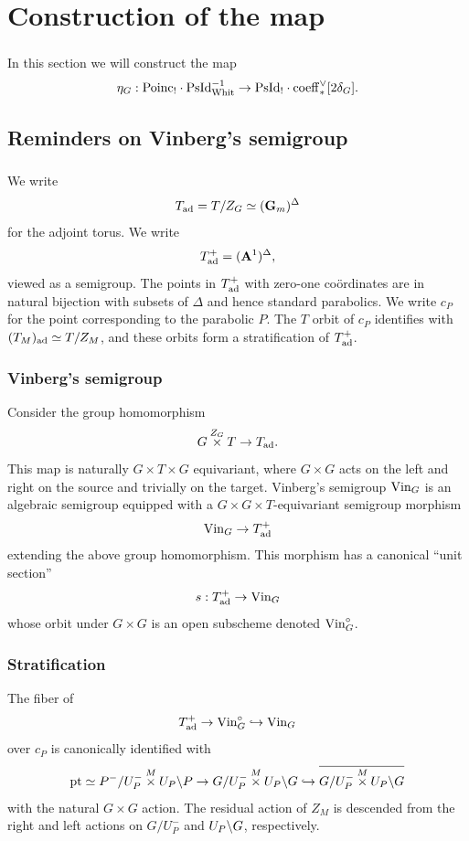 \section{Construction of the map}
\label{section:construction}

\subsubsection{} In this section we will construct the map
  \[\eta_G : \mathrm{Poinc}_! \cdot \mathrm{PsId}_{\mathrm{Whit}}^{-1} \to \mathrm{PsId}_! \cdot \mathrm{coeff}_*^\vee [2 \delta_G].\]

\subsection{Reminders on Vinberg's semigroup}

\subsubsection{} We write
    \[T_{\mathrm{ad}} = T/Z_G \simeq (\mathbf{G}_m)^\Delta\]
for the adjoint torus. We write
    \[T_{\mathrm{ad}}^+ = (\mathbf{A}^1)^\Delta,\]
viewed as a semigroup. The points in $T_{\mathrm{ad}}^+$ with zero-one co\"ordinates are in natural bijection with subsets of $\Delta$ and hence standard parabolics. We write $c_P$ for the point corresponding to the parabolic $P$. The $T$ orbit of $c_P$ identifies with $(T_M)_{\mathrm{ad}} \simeq T/Z_M$, and these orbits form a stratification of $T_{\mathrm{ad}}^+$.

\subsubsection{Vinberg's semigroup} Consider the group homomorphism
    \[G \overset{Z_G}{\times} T \to T_{\mathrm{ad}}.\]
This map is naturally $G \times T \times G$ equivariant, where $G \times G$ acts on the left and right on the source and trivially on the target. Vinberg's semigroup $\mathrm{Vin}_G$ is an algebraic semigroup equipped with a $G \times G \times T$-equivariant semigroup morphism
    \[\mathrm{Vin}_G \to T_{\mathrm{ad}}^+\]
extending the above group homomorphism. This morphism has a canonical ``unit section''
    \[s : T^+_{\mathrm{ad}} \to \mathrm{Vin}_G\]
whose orbit under $G \times G$ is an open subscheme denoted $\mathrm{Vin}_G^\circ$.

\subsubsection{Stratification} The fiber of
    \[T_{\mathrm{ad}}^+ \to \mathrm{Vin}_G^\circ \hookrightarrow \mathrm{Vin}_G\]
over $c_P$ is canonically identified with
\begin{equation}
\label{eqn:Vin_G_strata}    
    \mathrm{pt} \simeq P^-/U_P^- \overset{M}{\times} U_P \backslash P
    \to G/U_P^- \overset{M}{\times} U_P \backslash G 
    \hookrightarrow \overline{G/U_P^- \overset{M}{\times} U_P \backslash G}
\end{equation}
with the natural $G \times G$ action. The residual action of $Z_M$ is descended from the right and left actions on $G/U_P^-$ and $U_P \backslash G$, respectively.

